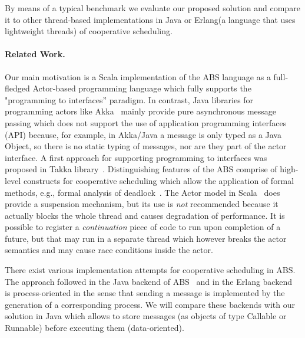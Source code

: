 By means of a typical benchmark we evaluate our proposed solution and compare it
to other thread-based implementations in Java or Erlang(a language that uses lightweight threads) of cooperative scheduling.


\paragraph{Related Work.} 
Our main motivation is a Scala implementation of the ABS language as a full-fledged Actor-based programming language which fully supports the "programming to interfaces'' paradigm. 
In contrast, Java libraries for programming actors like Akka~\cite{Akka} mainly provide pure asynchronous message passing which does not support the use of application programming interfaces (API) because, for example, in Akka/Java a message is only typed as a Java Object, so there is no static typing of messages, nor are they part of the actor interface.  A first approach for supporting programming to interfaces was proposed in Takka library~\cite{takka}. 
Distinguishing features of the ABS comprise of high-level constructs for cooperative scheduling which allow the application of formal methods, e.g.,
formal analysis of deadlock~\cite{deadlock}.
The Actor model in Scala~\cite{Scala} does provide a suspension mechanism, but its use is \emph{not} recommended because it actually blocks the whole thread and causes
degradation of performance.
It is possible to register a {\em continuation} piece of code to run upon completion of a future, but that may run in a separate thread which however breaks the actor semantics and may cause race conditions inside the actor.

There exist various implementation attempts for cooperative scheduling in ABS.
The approach followed in the Java backend of ABS~\cite{abs,Schafer} and in the Erlang backend~\cite{Erlang} is process-oriented in the sense that sending a message is implemented by the generation of a corresponding process. We will compare these backends with our solution in Java which allows to store messages (as objects of type Callable or Runnable) before executing them (data-oriented).

